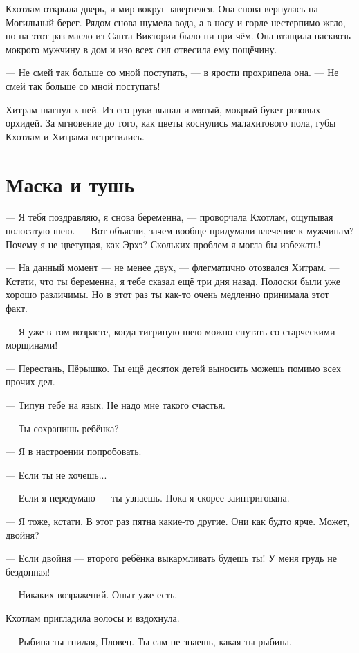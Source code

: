 Кхотлам открыла дверь, и мир вокруг завертелся.
Она снова вернулась на Могильный берег.
Рядом снова шумела вода, а в носу и горле нестерпимо жгло, но на этот раз масло из Санта-Виктории было ни при чём.
Она втащила насквозь мокрого мужчину в дом и изо всех сил отвесила ему пощёчину.

--- Не смей так больше со мной поступать, --- в ярости прохрипела она.
--- Не смей так больше со мной поступать!

Хитрам шагнул к ней.
Из его руки выпал измятый, мокрый букет розовых орхидей.
За мгновение до того, как цветы коснулись малахитового пола, губы Кхотлам и Хитрама встретились.

\chapter{Маска и тушь}

--- Я тебя поздравляю, я снова беременна, --- проворчала Кхотлам, ощупывая полосатую шею.
--- Вот объясни, зачем вообще придумали влечение к мужчинам?
Почему я не цветущая, как Эрхэ?
Скольких проблем я могла бы избежать!

--- На данный момент --- не менее двух, --- флегматично отозвался Хитрам.
--- Кстати, что ты беременна, я тебе сказал ещё три дня назад.
Полоски были уже хорошо различимы.
Но в этот раз ты как-то очень медленно принимала этот факт.

--- Я уже в том возрасте, когда тигриную шею можно спутать со старческими морщинами!

--- Перестань, Пёрышко.
Ты ещё десяток детей выносить можешь помимо всех прочих дел.

--- Типун тебе на язык.
Не надо мне такого счастья.

--- Ты сохранишь ребёнка?

--- Я в настроении попробовать.

--- Если ты не хочешь...

--- Если я передумаю --- ты узнаешь.
Пока я скорее заинтригована.

--- Я тоже, кстати.
В этот раз пятна какие-то другие.
Они как будто ярче.
Может, двойня?

--- Если двойня --- второго ребёнка выкармливать будешь ты!
У меня грудь не бездонная!

--- Никаких возражений.
Опыт уже есть.

Кхотлам пригладила волосы и вздохнула.

--- Рыбина ты гнилая, Пловец.
Ты сам не знаешь, какая ты рыбина.

